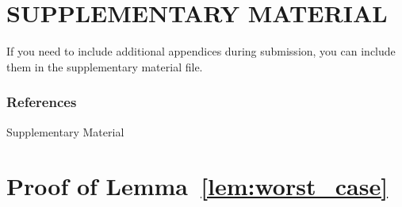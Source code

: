 \documentclass[twoside]{article} \usepackage{aistats2017}
\begin{document}
\section{SUPPLEMENTARY MATERIAL}

If you need to include additional appendices during submission, you
can include them in the supplementary material file.

\fi


\newpage
\subsubsection*{References}
\vspace{-25pt} 
%




\clearpage
\appendix

\begin{center}
{\Large Supplementary Material}
\end{center}

\section{Proof of Lemma~\ref{lem:worst_case}}\label{app:worst_case_proof}
\end{document}
